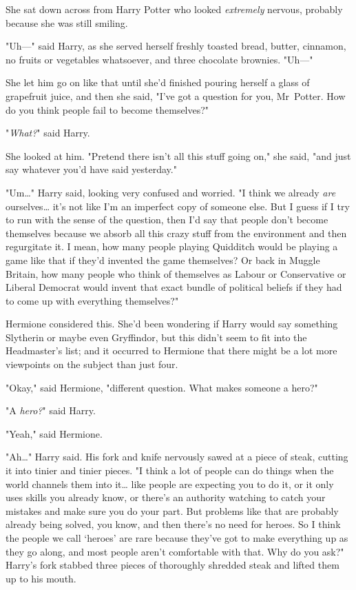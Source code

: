She sat down across from Harry Potter who looked \emph{extremely} nervous,
probably because she was still smiling.

"Uh---" said Harry, as she served herself freshly toasted bread, butter,
cinnamon, no fruits or vegetables whatsoever, and three chocolate
brownies. "Uh---"

She let him go on like that until she'd finished pouring herself a glass of
grapefruit juice, and then she said, "I've got a question for you, Mr~Potter.
How do you think people fail to become themselves?"

"\emph{What?}" said Harry.

She looked at him. "Pretend there isn't all this stuff going on," she said,
"and just say whatever you'd have said yesterday."

"Um{\ldots}" Harry said, looking very confused and worried. "I think we already
\emph{are} ourselves{\ldots} it's not like I'm an imperfect copy of someone
else. But I guess if I try to run with the sense of the question, then I'd say
that people don't become themselves because we absorb all this crazy stuff from
the environment and then regurgitate it. I mean, how many people playing
Quidditch would be playing a game like that if they'd invented the game
themselves? Or back in Muggle Britain, how many people who think of themselves
as Labour or Conservative or Liberal Democrat would invent that exact bundle of
political beliefs if they had to come up with everything themselves?"

Hermione considered this. She'd been wondering if Harry would say something
Slytherin or maybe even Gryffindor, but this didn't seem to fit into the
Headmaster's list; and it occurred to Hermione that there might be a lot more
viewpoints on the subject than just four.

"Okay," said Hermione, "different question. What makes someone a hero?"

"A \emph{hero?}" said Harry.

"Yeah," said Hermione.

"Ah{\ldots}" Harry said. His fork and knife nervously sawed at a piece of
steak, cutting it into tinier and tinier pieces. "I think a lot of people can
do things when the world channels them into it{\ldots} like people are
expecting you to do it, or it only uses skills you already know, or there's an
authority watching to catch your mistakes and make sure you do your part. But
problems like that are probably already being solved, you know, and then
there's no need for heroes. So I think the people we call `heroes' are rare
because they've got to make everything up as they go along, and most people
aren't comfortable with that. Why do you ask?" Harry's fork stabbed three
pieces of thoroughly shredded steak and lifted them up to his mouth.

